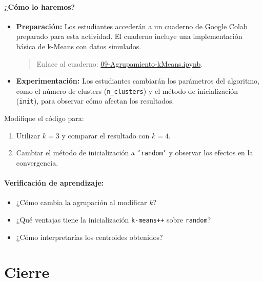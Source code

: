 \documentclass[a4,11pt]{aleph-notas}
\begin{document}
\paragraph{¿Cómo lo haremos?}  
\begin{itemize}[leftmargin=*]
    \item \textbf{Preparación:} 
    Los estudiantes accederán a un cuaderno de Google Colab preparado para esta actividad. El cuaderno incluye una implementación básica de k-Means con datos simulados.
    \begin{quote}
        Enlace al cuaderno: \href{https://colab.research.google.com/github/andres-merino/AprendizajeAutomaticoInicial-05-N0105/blob/main/2-Notebooks/09-Agrupamiento-kMeans.ipynb}{09-Agrupamiento-kMeans.ipynb}.
    \end{quote}
    \item \textbf{Experimentación:} 
    Los estudiantes cambiarán los parámetros del algoritmo, como el número de clusters (\texttt{n\_clusters}) y el método de inicialización (\texttt{init}), para observar cómo afectan los resultados.
\end{itemize}

\begin{ejer}
Modifique el código para:
\begin{enumerate}[leftmargin=*]
    \item Utilizar \(k = 3\) y comparar el resultado con \(k = 4\).
    \item Cambiar el método de inicialización a \texttt{'random'} y observar los efectos en la convergencia.
\end{enumerate}
\end{ejer}

\paragraph{Verificación de aprendizaje:}  
\begin{itemize}[leftmargin=*]
    \item ¿Cómo cambia la agrupación al modificar \(k\)?
    \item ¿Qué ventajas tiene la inicialización \texttt{k-means++} sobre \texttt{random}?
    \item ¿Cómo interpretarías los centroides obtenidos?
\end{itemize}

\section*{Cierre}
\end{document}
